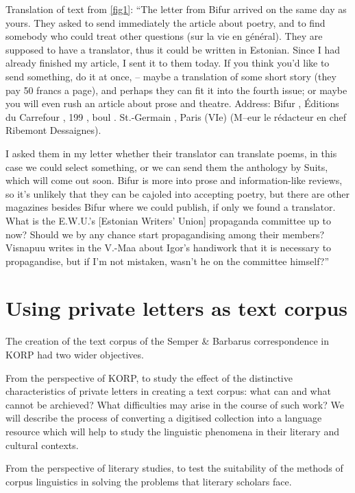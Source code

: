 \documentclass[runningheads]{llncs}
\begin{document}
Translation of text from \ref{fig1}:
``The letter from Bifur arrived on the same day as yours. They asked to send immediately the article about poetry, and to find somebody who could treat other questions (sur la vie en g\'en\'eral). They are supposed to have a translator, thus it could be written in Estonian. Since I had already finished my article, I sent it to them today. If you think you’d like to send something, do it at once, – maybe a translation of some short story (they pay 50 francs a page), and perhaps they can fit it into the fourth issue; or maybe you will even rush an article about prose and theatre. Address: Bifur , \'Editions du Carrefour , 199 , boul . St.-Germain , Paris (VIe) (M–eur le r\'edacteur en chef Ribemont Dessaignes).

I asked them in my letter whether their translator can translate poems, in this case we could select something, or we can send them the anthology by Suits, which will come out soon. Bifur is more into prose and information-like reviews, so it’s unlikely that they can be cajoled into accepting poetry, but there are other magazines besides Bifur where we could publish, if only we found a translator. What is the E.W.U.’s [Estonian Writers’ Union] propaganda committee up to now? Should we by any chance start propagandising among their members? Visnapuu writes in the V.-Maa about Igor’s handiwork that it is necessary to propagandise, but if I’m not mistaken, wasn’t he on the committee himself?''




\section{Using private letters as text corpus}

The creation of the text corpus of the Semper \& Barbarus correspondence in KORP had two wider objectives.  

From the perspective of KORP, to study the effect of the distinctive characteristics of private letters in creating a text corpus: what can and what cannot be archieved? What difficulties may arise in the course of such work? We will describe the process of converting a digitised collection into a language resource which will help to study the linguistic phenomena in their literary and cultural contexts.

From the perspective of literary studies, to test the suitability of the methods of corpus linguistics in solving the problems that literary scholars face.
\end{document}

